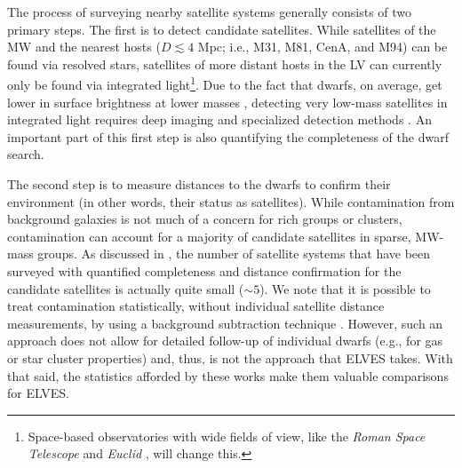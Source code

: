 \documentclass[twocolumn]{aastex62}
\begin{document}
 
 
The process of surveying nearby satellite systems generally consists of two primary steps. The first is to detect candidate satellites. While satellites of the MW and the nearest hosts ($D\lesssim4$ Mpc; i.e., M31, M81, CenA, and M94) can be found via resolved stars, satellites of more distant hosts in the LV can currently only be found via integrated light\footnote{Space-based observatories with wide fields of view, like the \emph{Roman Space Telescope} \citep{spergel2015} and \emph{Euclid} \citep{euclid}, will change this.}. Due to the fact that dwarfs, on average, get lower in surface brightness at lower masses \citep{mateo1998, kormendy2009, danieli_field, carlsten2021a}, detecting very low-mass satellites in integrated light requires deep imaging and specialized detection methods \citep[e.g.][]{bennet2017, greco2018, danieli2019, carlsten2020a}. An important part of this first step is also quantifying the completeness of the dwarf search. 

The second step is to measure distances to the dwarfs to confirm their environment (in other words, their status as satellites). While contamination from background galaxies is not much of a concern for rich groups or clusters, contamination can account for a majority of candidate satellites \citep[$>80$\%;][]{sbf_m101, bennet2019} in sparse, MW-mass groups. As discussed in \citet{carlsten2020b}, the number of satellite systems that have been surveyed \citep[prior to ELVES and the SAGA Survey,][see below]{mao2020} with quantified completeness  and distance confirmation for the candidate satellites is actually quite small ($\sim5$). We note that it is possible to treat contamination statistically, without individual satellite distance measurements, by using a background subtraction technique \citep[e.g.][]{wang2012, wang2021, nierenberg2016, tanaka2018, xi2018, roberts2021, wu2021}. However, such an approach does not allow for detailed follow-up of individual dwarfs (e.g., for gas or star cluster properties) and, thus, is not the approach that ELVES takes. With that said, the statistics afforded by these works make them valuable comparisons for ELVES.
\end{document}
